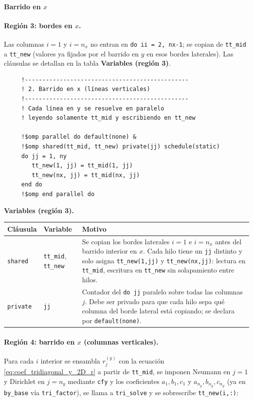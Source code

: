 \documentclass[11pt,a4paper]{article}
\begin{document}
\paragraph{Barrido en $x$}

\medskip

\paragraph{Regi\'on 3: bordes en $x$.}
Las columnas $i=1$ y $i=n_x$ no entran en \texttt{do ii = 2, nx-1}; se copian de
\texttt{tt\_mid} a \texttt{tt\_new} (valores ya fijados por el barrido en $y$ en
esos bordes laterales). Las cl\'ausulas se detallan en la tabla 
\textbf{Variables (regi\'on 3)}.

\begin{verbatim}
     !-----------------------------------------------   
     ! 2. Barrido en x (líneas verticales)
     !-----------------------------------------------
     ! Cada línea en y se resuelve en paralelo
     ! leyendo solamente tt_mid y escribiendo en tt_new

     !$omp parallel do default(none) &
     !$omp shared(tt_mid, tt_new) private(jj) schedule(static)
     do jj = 1, ny
        tt_new(1, jj) = tt_mid(1, jj)
        tt_new(nx, jj) = tt_mid(nx, jj)
     end do
     !$omp end parallel do
\end{verbatim}

\noindent\textbf{Variables (regi\'on 3).}
\begin{center}
\footnotesize
\begin{tabular}{@{}llM{7.6cm}@{}}
\hline
Cl\'ausula & Variable & Motivo \\
\hline
\texttt{shared} & \texttt{tt\_mid}, \texttt{tt\_new} &
Se copian los bordes laterales $i=1$ e $i=n_x$ antes del barrido interior en $x$.
Cada hilo tiene un \texttt{jj} distinto y solo asigna \texttt{tt\_new(1,jj)} y
\texttt{tt\_new(nx,jj)}: lectura en \texttt{tt\_mid}, escritura en \texttt{tt\_new}
sin solapamiento entre hilos. \\
\texttt{private} & \texttt{jj} &
Contador del \texttt{do jj} paralelo sobre todas las columnas $j$. Debe ser
privado para que cada hilo sepa qu\'e columna del borde lateral est\'a copiando;
se declara por \texttt{default(none)}. \\
\hline
\end{tabular}
\end{center}

\paragraph{Regi\'on 4: barrido en $x$ (columnas verticales).}
Para cada $i$ interior se ensambla $r_j^{(y)}$ con la ecuaci\'on
\ref{eq:coef_tridiagonal_y_2D_r} a partir de \texttt{tt\_mid}, se imponen Neumann
en $j=1$ y Dirichlet en $j=n_y$ mediante \texttt{cfy} y los coeficientes
$a_1,b_1,c_1$ y $a_{n_y},b_{n_y},c_{n_y}$ (ya en \texttt{by\_base} v\'ia
\texttt{tri\_factor}), se llama a \texttt{tri\_solve} y se sobrescribe
\texttt{tt\_new(i,:)}:
\end{document}
